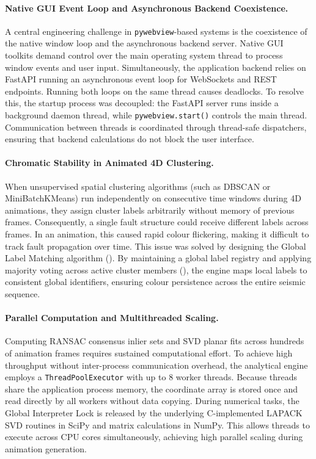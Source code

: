 \paragraph{Native GUI Event Loop and Asynchronous Backend Coexistence.}
A central engineering challenge in \texttt{pywebview}-based systems is the coexistence of the native window loop and the asynchronous backend server. Native GUI toolkits demand control over the main operating system thread to process window events and user input. Simultaneously, the application backend relies on FastAPI running an asynchronous event loop for WebSockets and REST endpoints. Running both loops on the same thread causes deadlocks. To resolve this, the startup process was decoupled: the FastAPI server runs inside a background daemon thread, while \texttt{pywebview.start()} controls the main thread. Communication between threads is coordinated through thread-safe dispatchers, ensuring that backend calculations do not block the user interface.

\paragraph{Chromatic Stability in Animated 4D Clustering.}
When unsupervised spatial clustering algorithms (such as DBSCAN or MiniBatchKMeans) run independently on consecutive time windows during 4D animations, they assign cluster labels arbitrarily without memory of previous frames. Consequently, a single fault structure could receive different labels across frames. In an animation, this caused rapid colour flickering, making it difficult to track fault propagation over time. This issue was solved by designing the Global Label Matching algorithm (). By maintaining a global label registry and applying majority voting across active cluster members (), the engine maps local labels to consistent global identifiers, ensuring colour persistence across the entire seismic sequence.

\paragraph{Parallel Computation and Multithreaded Scaling.}
Computing RANSAC consensus inlier sets and SVD planar fits across hundreds of animation frames requires sustained computational effort. To achieve high throughput without inter-process communication overhead, the analytical engine employs a \texttt{ThreadPoolExecutor} with up to 8 worker threads. Because threads share the application process memory, the coordinate array is stored once and read directly by all workers without data copying. During numerical tasks, the Global Interpreter Lock is released by the underlying C-implemented LAPACK SVD routines in SciPy and matrix calculations in NumPy. This allows threads to execute across CPU cores simultaneously, achieving high parallel scaling during animation generation.

